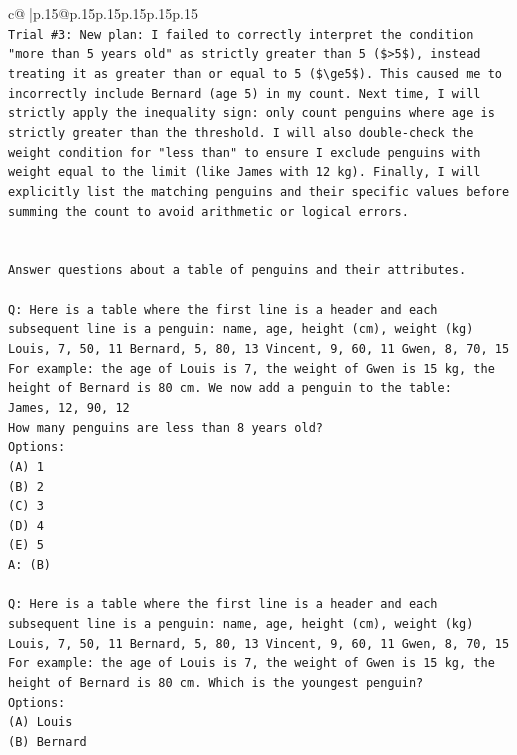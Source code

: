\documentclass{article}
\begin{document}
{\begin{supertabular}{c@{$\;$}|p{.15\linewidth}@{}p{.15\linewidth}p{.15\linewidth}p{.15\linewidth}p{.15\linewidth}p{.15\linewidth}}
{{{\\ 
\texttt{Trial \#3: New plan: I failed to correctly interpret the condition "more than 5 years old" as strictly greater than 5 (\$>5\$), instead treating it as greater than or equal to 5 (\$\textbackslash{}ge5\$). This caused me to incorrectly include Bernard (age 5) in my count. Next time, I will strictly apply the inequality sign: only count penguins where age is strictly greater than the threshold. I will also double{-}check the weight condition for "less than" to ensure I exclude penguins with weight equal to the limit (like James with 12 kg). Finally, I will explicitly list the matching penguins and their specific values before summing the count to avoid arithmetic or logical errors.} \\
\\ 
\\ 
\texttt{Answer questions about a table of penguins and their attributes.} \\
\\ 
\texttt{Q: Here is a table where the first line is a header and each subsequent line is a penguin:  name, age, height (cm), weight (kg) Louis, 7, 50, 11 Bernard, 5, 80, 13 Vincent, 9, 60, 11 Gwen, 8, 70, 15  For example: the age of Louis is 7, the weight of Gwen is 15 kg, the height of Bernard is 80 cm.  We now add a penguin to the table:} \\
\texttt{James, 12, 90, 12} \\
\texttt{How many penguins are less than 8 years old?} \\
\texttt{Options:} \\
\texttt{(A) 1} \\
\texttt{(B) 2} \\
\texttt{(C) 3} \\
\texttt{(D) 4} \\
\texttt{(E) 5} \\
\texttt{A: (B)} \\
\\ 
\texttt{Q: Here is a table where the first line is a header and each subsequent line is a penguin:  name, age, height (cm), weight (kg) Louis, 7, 50, 11 Bernard, 5, 80, 13 Vincent, 9, 60, 11 Gwen, 8, 70, 15  For example: the age of Louis is 7, the weight of Gwen is 15 kg, the height of Bernard is 80 cm.  Which is the youngest penguin?} \\
\texttt{Options:} \\
\texttt{(A) Louis} \\
\texttt{(B) Bernard} \\
}}}
\end{supertabular}}
\end{document}
